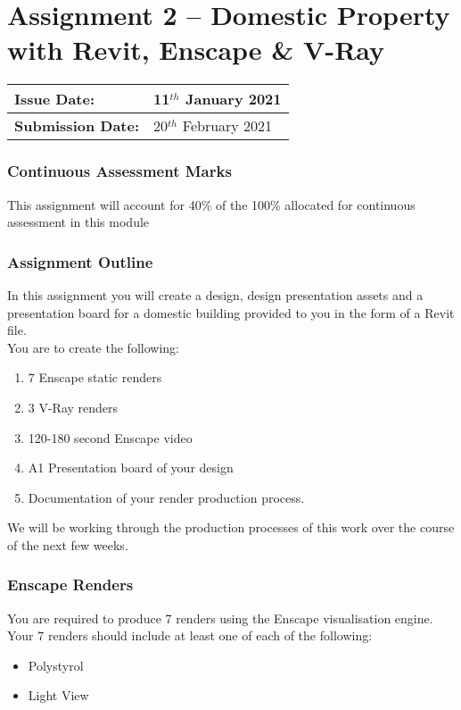 
	
\part*{Assignment 2 – Domestic Property with  Revit, Enscape \& V-Ray }

\begin{tabularx}{\textwidth}{ |X|X| }
	\hline
	\textbf{Issue Date:} & 11$^{th}$ January 2021 \\
	\hline 
	\textbf{Submission Date:}  & 20$^{th}$ February 2021  \\
	\hline
\end{tabularx}


\section*{Continuous Assessment Marks}
This assignment will account for 40\% of the 100\% allocated for continuous assessment in this module

\section*{Assignment Outline}
In this assignment you will create a design, design presentation assets and a presentation board for a domestic building provided to you in the form of a Revit file. \\

You are to create the following:

\begin{enumerate}
	\item 7 Enscape static renders
	\item 3 V-Ray renders
	\item 120-180 second Enscape video
	\item A1 Presentation board of your design
	\item Documentation of your render production process.
\end{enumerate}

We will be working through the production processes of this work over the course of the next few weeks.\\

\newpage

\section*{Enscape Renders}

You are required to produce 7 renders using the Enscape visualisation engine.  Your 7 renders should include at least one of each of the following:
\begin{itemize}
	\item Polystyrol
	\item Light View
\end{itemize}

